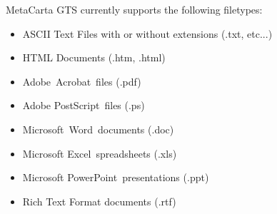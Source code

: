 %
%

MetaCarta GTS currently supports the following filetypes:

\begin{itemize}
\item ASCII Text Files with or without extensions (.txt, etc...)
\item HTML Documents (.htm, .html)
\item Adobe\circler\ Acrobat\circler\ files (.pdf)
\item Adobe PostScript\circler\ files (.ps)
\item Microsoft\circler\ Word\circler\ documents (.doc)
\item Microsoft Excel\circler\ spreadsheets (.xls)
\item Microsoft PowerPoint\circler\ presentations (.ppt)
\item Rich Text Format documents (.rtf)
\end{itemize}


